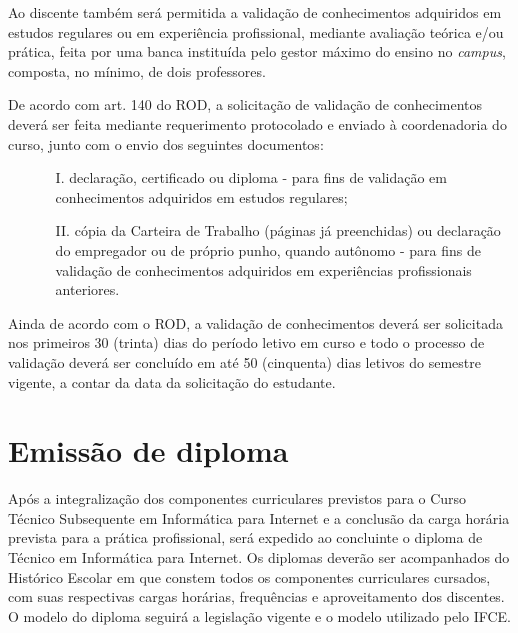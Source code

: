 \documentclass[
	12pt,				%
	openright,			%
	twoside,			%
	a4paper,			%
	chapter=TITLE,		%
	english,			%
	french,				%
	spanish,			%
	brazil,				%
	]{abntex2}
\begin{document}
Ao discente também será permitida a validação de conhecimentos adquiridos em estudos regulares ou em experiência profissional, mediante avaliação teórica e/ou prática, feita por uma banca instituída pelo gestor máximo do ensino no \textit{campus}, composta, no mínimo, de dois professores. 

De acordo com art. 140 do ROD, a solicitação de validação de conhecimentos deverá ser feita mediante requerimento protocolado e enviado à coordenadoria do curso, junto com o envio dos seguintes documentos: 
\begin{itemize}
\item[]
\begin{itemize}
	\item [I.] declaração, certificado ou diploma - para fins de validação em conhecimentos adquiridos em estudos regulares; 
	\item [II.] cópia da Carteira de Trabalho (páginas já preenchidas) ou declaração do empregador ou de próprio punho, quando autônomo - para fins de validação de conhecimentos adquiridos em experiências profissionais anteriores. 
\end{itemize}
\end{itemize}

Ainda de acordo com o ROD, a validação de conhecimentos deverá ser solicitada nos primeiros 30 (trinta) dias do período letivo em curso e todo o processo de validação deverá ser concluído em até 50 (cinquenta) dias letivos do semestre vigente, a contar da data da solicitação do estudante. 


\chapter{Emissão de diploma}

Após a integralização dos componentes curriculares previstos para o Curso Técnico Subsequente em Informática para Internet e a conclusão da carga horária prevista para a prática profissional, será expedido ao concluinte o diploma de Técnico em Informática para Internet. Os diplomas deverão ser acompanhados do Histórico Escolar em que constem todos os componentes curriculares cursados, com suas respectivas cargas horárias, frequências e aproveitamento dos discentes. O modelo do diploma seguirá a legislação vigente e o modelo utilizado pelo IFCE.
\end{document}
